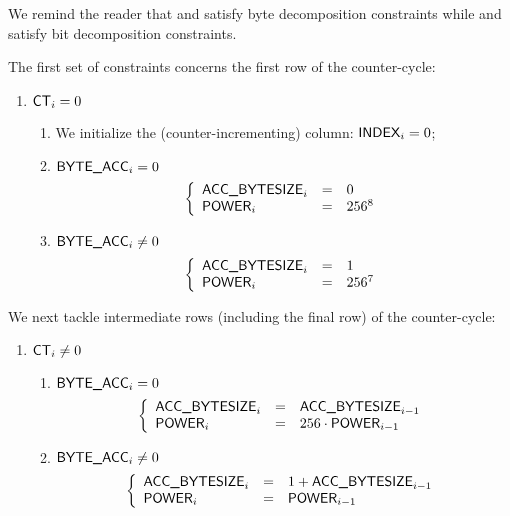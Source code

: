 \begin{center}
\end{center}

We remind the reader that
\genByte{} and \genByteAcc{} satisfy byte decomposition constraints while
\genBit{}  and \genBitAcc{}  satisfy bit  decomposition constraints.

The first set of constraints concerns the first row of the counter-cycle:
\begin{enumerate}
	\item \If $\textsf{CT}_{i}=0$ \Then
		\begin{enumerate}
			\item We initialize the (counter-incrementing) \index{} column: \( \textsf{INDEX}_{i} = 0 \);
			\item \If $\textsf{BYTE}\textsf{\_}\textsf{ACC}_{i} = 0$ \Then 
				\[
					\left\{ \begin{array}{lcl}
						\textsf{ACC\_BYTESIZE}_{i}      & = & 0       \\
						\textsf{POWER}_{i}   & = & 256^{8} \\
					\end{array} \right.
				\]
			\item \If $\textsf{BYTE}\textsf{\_}\textsf{ACC}_{i} \ne 0$ \Then
				\[
					\left\{ \begin{array}{lcl}
						\textsf{ACC\_BYTESIZE}_{i}      & = & 1       \\
						\textsf{POWER}_{i}   & = & 256^{7} \\
					\end{array} \right.
				\]
		\end{enumerate}
\end{enumerate}
We next tackle intermediate rows (including the final row) of the counter-cycle:
\begin{enumerate}[resume]
	\item \If $\textsf{CT}_{i} \ne 0$ \Then
		\begin{enumerate}
			\item \If $\textsf{BYTE}\textsf{\_}\textsf{ACC}_{i} = 0$ \Then
				\[
					\left\{ \begin{array}{lcl}
						\textsf{ACC\_BYTESIZE}_{i}      & = & \textsf{ACC\_BYTESIZE}_{i - 1}              \\
						\textsf{POWER}_{i}   & = & 256 \cdot \textsf{POWER}_{i - 1} \\
					\end{array} \right.
				\]
			\item \If $\textsf{BYTE}\textsf{\_}\textsf{ACC}_{i} \ne 0$ \Then
				\[
					\left\{ \begin{array}{lcl}
						\textsf{ACC\_BYTESIZE}_{i}      & = & 1 + \textsf{ACC\_BYTESIZE}_{i - 1} \\
						\textsf{POWER}_{i}   & = & \textsf{POWER}_{i - 1}  \\
					\end{array} \right.
				\]
		\end{enumerate}
\end{enumerate}
